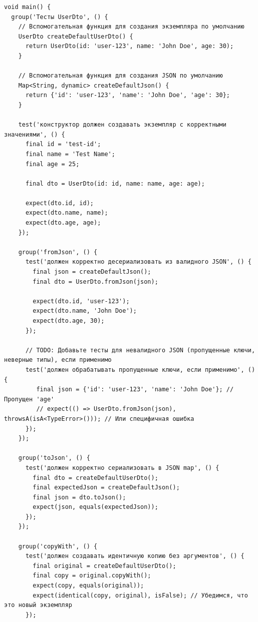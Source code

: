 \documentclass[14pt, russian]{scrartcl}
\begin{document}
\begin{listing}[!htb]
\caption{Пример сгенерированного теста для DTO (Dart) - продолжение}
\begin{verbatim}
void main() {
  group('Тесты UserDto', () {
    // Вспомогательная функция для создания экземпляра по умолчанию
    UserDto createDefaultUserDto() {
      return UserDto(id: 'user-123', name: 'John Doe', age: 30);
    }

    // Вспомогательная функция для создания JSON по умолчанию
    Map<String, dynamic> createDefaultJson() {
      return {'id': 'user-123', 'name': 'John Doe', 'age': 30};
    }

    test('конструктор должен создавать экземпляр с корректными значениями', () {
      final id = 'test-id';
      final name = 'Test Name';
      final age = 25;

      final dto = UserDto(id: id, name: name, age: age);

      expect(dto.id, id);
      expect(dto.name, name);
      expect(dto.age, age);
    });

    group('fromJson', () {
      test('должен корректно десериализовать из валидного JSON', () {
        final json = createDefaultJson();
        final dto = UserDto.fromJson(json);

        expect(dto.id, 'user-123');
        expect(dto.name, 'John Doe');
        expect(dto.age, 30);
      });

      // TODO: Добавьте тесты для невалидного JSON (пропущенные ключи, неверные типы), если применимо
      test('должен обрабатывать пропущенные ключи, если применимо', () {
         final json = {'id': 'user-123', 'name': 'John Doe'}; // Пропущен 'age'
         // expect(() => UserDto.fromJson(json), throwsA(isA<TypeError>())); // Или специфичная ошибка
      });
    });

    group('toJson', () {
      test('должен корректно сериализовать в JSON map', () {
        final dto = createDefaultUserDto();
        final expectedJson = createDefaultJson();
        final json = dto.toJson();
        expect(json, equals(expectedJson));
      });
    });

    group('copyWith', () {
      test('должен создавать идентичную копию без аргументов', () {
        final original = createDefaultUserDto();
        final copy = original.copyWith();
        expect(copy, equals(original));
        expect(identical(copy, original), isFalse); // Убедимся, что это новый экземпляр
      });

\end{verbatim}
\end{listing}
\end{document}
